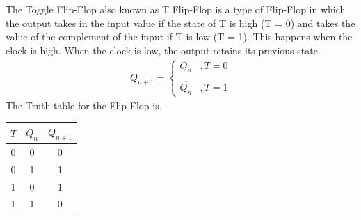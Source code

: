 \documentclass{article}
\begin{document}
The Toggle Flip-Flop also known as T Flip-Flop is a type of Flip-Flop in which the output takes in the input value if the state of T is high (T = 0) and takes the value of the complement of the input if T is low (T = 1). This happens when the clock is high. When the clock is low, the output retains its previous state.
\begin{align*}
    Q_{n + 1} = 
    \begin{cases}
        Q_n &, T = 0\\\\
        \overline{Q_n} &, T = 1
    \end{cases}
\end{align*}
The Truth table for the Flip-Flop is,\\
\begin{table}[h]
\centering
\begin{tabular}{|c|c|c|}
\hline
$T$ & $Q_n$ & $Q_{n+1}$ \\
\hline
0 & 0 & 0 \\
0 & 1 & 1 \\
1 & 0 & 1 \\
1 & 1 & 0 \\
\hline
\end{tabular}
\end{table}
\end{document}
